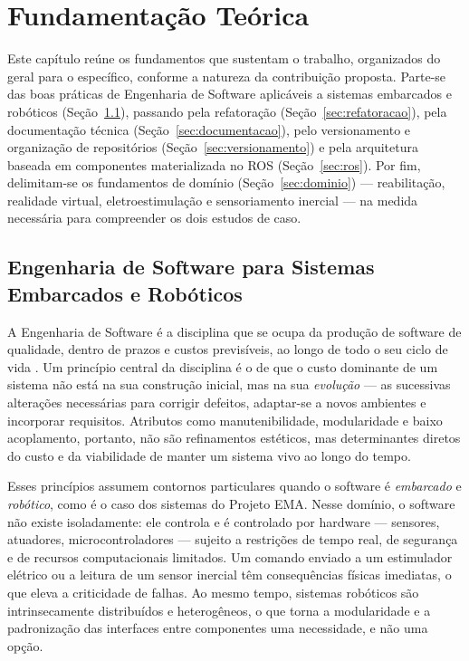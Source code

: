 \chapter{Fundamentação Teórica}
\label{cap:fundamentacao}

Este capítulo reúne os fundamentos que sustentam o trabalho, organizados do geral para o
específico, conforme a natureza da contribuição proposta. Parte-se das boas práticas de
Engenharia de Software aplicáveis a sistemas embarcados e robóticos
(Seção~\ref{sec:es-embarcados}), passando pela refatoração
(Seção~\ref{sec:refatoracao}), pela documentação técnica (Seção~\ref{sec:documentacao}),
pelo versionamento e organização de repositórios (Seção~\ref{sec:versionamento}) e pela
arquitetura baseada em componentes materializada no ROS (Seção~\ref{sec:ros}). Por fim,
delimitam-se os fundamentos de domínio (Seção~\ref{sec:dominio}) --- reabilitação,
realidade virtual, eletroestimulação e sensoriamento inercial --- na medida necessária
para compreender os dois estudos de caso.

\section{Engenharia de Software para Sistemas Embarcados e Robóticos}
\label{sec:es-embarcados}

A Engenharia de Software é a disciplina que se ocupa da produção de software de qualidade,
dentro de prazos e custos previsíveis, ao longo de todo o seu ciclo de vida
\cite{sommerville2011}. Um princípio central da disciplina é o de que o custo dominante de
um sistema não está na sua construção inicial, mas na sua \emph{evolução} --- as
sucessivas alterações necessárias para corrigir defeitos, adaptar-se a novos ambientes e
incorporar requisitos. Atributos como manutenibilidade, modularidade e baixo acoplamento,
portanto, não são refinamentos estéticos, mas determinantes diretos do custo e da
viabilidade de manter um sistema vivo ao longo do tempo.

Esses princípios assumem contornos particulares quando o software é \emph{embarcado} e
\emph{robótico}, como é o caso dos sistemas do Projeto EMA. Nesse domínio, o software não
existe isoladamente: ele controla e é controlado por hardware --- sensores, atuadores,
microcontroladores --- sujeito a restrições de tempo real, de segurança e de recursos
computacionais limitados. Um comando enviado a um estimulador elétrico ou a leitura de um
sensor inercial têm consequências físicas imediatas, o que eleva a criticidade de falhas.
Ao mesmo tempo, sistemas robóticos são intrinsecamente distribuídos e heterogêneos, o que
torna a modularidade e a padronização das interfaces entre componentes uma necessidade, e
não uma opção.

